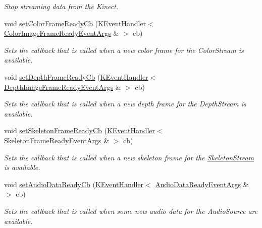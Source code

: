 \begin{DoxyCompactItemize}
\begin{DoxyCompactList}\small\item\em \-Stop streaming data from the \-Kinect. \end{DoxyCompactList}\item 
void \hyperlink{class_kinect_sensor_af713cec7f7ad15c119904e2b1ec5cac7}{set\-Color\-Frame\-Ready\-Cb} (\hyperlink{class_k_event_handler}{\-K\-Event\-Handler}$<$ \hyperlink{class_color_image_frame_ready_event_args}{\-Color\-Image\-Frame\-Ready\-Event\-Args} \& $>$ cb)
\begin{DoxyCompactList}\small\item\em \-Sets the callback that is called when a new color frame for the \-Color\-Stream is available. \end{DoxyCompactList}\item 
void \hyperlink{class_kinect_sensor_a9c852c922be21fb448507cc4112e4df1}{set\-Depth\-Frame\-Ready\-Cb} (\hyperlink{class_k_event_handler}{\-K\-Event\-Handler}$<$ \hyperlink{class_depth_image_frame_ready_event_args}{\-Depth\-Image\-Frame\-Ready\-Event\-Args} \& $>$ cb)
\begin{DoxyCompactList}\small\item\em \-Sets the callback that is called when a new depth frame for the \-Depth\-Stream is available. \end{DoxyCompactList}\item 
void \hyperlink{class_kinect_sensor_a7b88e8c4cd4ba3888a5f1938b50ed6c9}{set\-Skeleton\-Frame\-Ready\-Cb} (\hyperlink{class_k_event_handler}{\-K\-Event\-Handler}$<$ \hyperlink{class_skeleton_frame_ready_event_args}{\-Skeleton\-Frame\-Ready\-Event\-Args} \& $>$ cb)
\begin{DoxyCompactList}\small\item\em \-Sets the callback that is called when a new skeleton frame for the \hyperlink{class_skeleton_stream}{\-Skeleton\-Stream} is available. \end{DoxyCompactList}\item 
void \hyperlink{class_kinect_sensor_a3260dcfeec5d1768b93a01fe481deb58}{set\-Audio\-Data\-Ready\-Cb} (\hyperlink{class_k_event_handler}{\-K\-Event\-Handler}$<$ \hyperlink{class_audio_data_ready_event_args}{\-Audio\-Data\-Ready\-Event\-Args} \& $>$ cb)
\begin{DoxyCompactList}\small\item\em \-Sets the callback that is called when some new audio data for the \-Audio\-Source are available. \end{DoxyCompactList}\end{DoxyCompactItemize}
